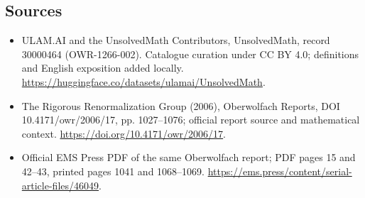 \documentclass[11pt]{article}
\begin{document}
\subsection{Sources}
\begin{itemize}
\item[\hypertarget{source:30000464:1}{S1}] ULAM.AI and the UnsolvedMath Contributors, UnsolvedMath, record 30000464 (OWR-1266-002). Catalogue curation under CC BY 4.0; definitions and English exposition added locally.
\url{https://huggingface.co/datasets/ulamai/UnsolvedMath}.
\item[\hypertarget{source:30000464:2}{S2}] The Rigorous Renormalization Group (2006), Oberwolfach Reports, DOI 10.4171/owr/2006/17, pp. 1027--1076; official report source and mathematical context.
\url{https://doi.org/10.4171/owr/2006/17}.
\item[\hypertarget{source:30000464:3}{S3}] Official EMS Press PDF of the same Oberwolfach report; PDF pages 15 and 42--43, printed pages 1041 and 1068--1069.
\url{https://ems.press/content/serial-article-files/46049}.
\end{itemize}
\label{end:30000464}
\end{document}
